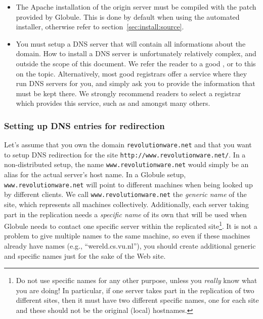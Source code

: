 \documentclass[10pt,a4paper]{article}
\makeatletter
\newenvironment{p}{\@open{P}{}}{\@close{P}}
\newenvironment{p}{}{\par}
\makeatother
\begin{document}
\begin{p}
\begin{itemize}
\item The Apache installation of the origin server must be compiled with the
  patch provided by Globule.  This is done by default when using the automated
  installer, otherwise refer to section~\ref{sec:install:source}.
  
\item You must setup a DNS server that will contain all informations
  about the domain.  How to install a DNS server is unfortunately
  relatively complex, and outside the scope of this document.  We
  refer the reader to a good
  , or to this
  on the topic.  Alternatively, most good registrars offer a service
  where they run DNS servers for you, and simply ask you to provide
  the information that must be kept there.  We strongly recommend
  readers to select a registrar which provides this service, such as
   and
   amongst many
  others.
\end{itemize}
\end{p}

\subsubsection{Setting up DNS entries for redirection}

\begin{p}
Let's assume that you own the domain \verb!revolutionware.net! and that you
want to setup DNS redirection for the site
\verb!http://www.revolutionware.net/!.  In a non-distributed setup, the name
\verb!www.revolutionware.net! would simply be an alias for the actual server's
host name.  In a Globule setup, \verb!www.revolutionware.net! will point to
different machines when being looked up by different clients.  We call
\verb!www.revolutionware.net! the \emph{generic name} of the site, which
represents all machines collectively.  Additionally, each server taking part
in the replication needs a \emph{specific name} of its own that will be used
when Globule needs to contact one specific server within the replicated
site\footnote{Do not use specific names for any other purpose, unless you
\emph{really} know what you are doing!  In particular, if one server takes
part in the replication of two different sites, then it must have two
different specific names, one for each site and these should not be the
original (local) hostnames.}.
It is not a problem to give multiple names to the same machine, so even if
these machines already have names (e.g., ``wereld.cs.vu.nl''), you should
create additional generic and specific names just for the sake of the Web
site.
\end{p}
\end{document}

